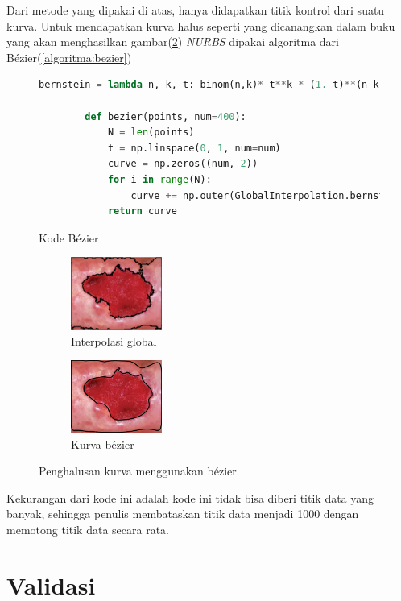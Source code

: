 Dari metode yang dipakai di atas, hanya didapatkan 
titik kontrol dari suatu kurva. Untuk mendapatkan 
kurva halus seperti yang dicanangkan dalam buku 
yang akan menghasilkan gambar(\ref{gambar:kurvaluka})
\textit{NURBS} dipakai algoritma dari Bézier(\ref{algoritma:bezier})
\begin{figure}[H]
	\centering
	\begin{lstlisting}[language=Python, basicstyle=\tiny]
		bernstein = lambda n, k, t: binom(n,k)* t**k * (1.-t)**(n-k)

		def bezier(points, num=400):
			N = len(points)
			t = np.linspace(0, 1, num=num)
			curve = np.zeros((num, 2))
			for i in range(N):
				curve += np.outer(GlobalInterpolation.bernstein(N - 1, i, t), points[i])
			return curve
	\end{lstlisting}
	\caption{Kode Bézier}
	\label{kode:bezier}
\end{figure}
\begin{figure}[H]
	\centering
	\begin{subfigure}{.3\textwidth}
		\centering
		\includegraphics[keepaspectratio, width=3cm]{gambar/Bab4/Luka_merah_Globalinterpolasi.jpg}
		\caption{Interpolasi global}
	\end{subfigure}
	\begin{subfigure}{.4\textwidth}
		\centering
		\includegraphics[keepaspectratio, width=3cm]{gambar/Bab4/Luka_merah_curve.jpg}
		\caption{Kurva bézier}
	\end{subfigure} 
	\caption{Penghalusan kurva menggunakan bézier}
	\label{gambar:kurvaluka}
\end{figure}
Kekurangan dari kode ini adalah kode ini tidak bisa diberi 
titik data yang banyak, sehingga penulis membataskan titik data 
menjadi 1000 dengan memotong titik data secara rata.

\section{Validasi}

